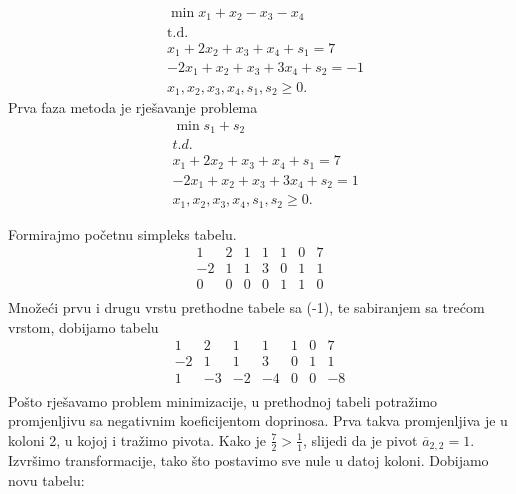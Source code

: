 \documentclass[a4paper, utf8, 11pt, colorlinks]{book}
\theoremstyle{definition}
\begin{document}
\begin{align*}
	&\min x_1 + x_2 - x_3 - x_4 \\
	&\mbox{t.d.} \\
	&x_1 + 2x_2 + x_3 + x_4 + s_1 = 7 \\
	& -2x_1 + x_2 + x_3 + 3x_4 + s_2 = -1 \\
	& x_1,x_2,x_3,x_4, s_1, s_2\geq 0.
\end{align*}
Prva faza metoda je rješavanje problema 
\begin{align*}
	&\min s_1 + s_2 \\
		&  {t.d.}\\
		& x_1 + 2x_2 + x_3 + x_4 + s_1 = 7 \\
	& -2x_1 + x_2 + x_3 + 3x_4 + s_2 = 1 \\
	& x_1,x_2,x_3,x_4, s_1, s_2\geq 0.
\end{align*}


Formirajmo početnu simpleks tabelu.
$$\begin{array}{cccccc|c}
	1 & 2 & 1 & 1 & 1 &  0 & 7  \\
   -2 & 1 & 1 & 3 & 0 &  1 & 1  \\ \hline
    0 & 0 & 0 & 0 & 1 & 1 &  0  \\
\end{array}
$$
Množeći prvu i drugu vrstu prethodne tabele sa (-1), te sabiranjem sa trećom vrstom, dobijamo tabelu
$$\begin{array}{cccccc|c}
	1 & 2 & 1 & 1 & 1 & 0 & 7 \\
	-2&1  & 1 & 3 & 0 & 1 & 1 \\ \hline
	1 & -3 & -2 & -4 & 0 & 0 & -8 \\ 
\end{array}
 $$
 Pošto rješavamo problem minimizacije, u prethodnoj tabeli potražimo promjenljivu 
 sa negativnim koeficijentom doprinosa. Prva takva promjenljiva je u koloni 2, u kojoj 
 i tražimo pivota.  Kako je $\frac{7}{2} > \frac{1}{1}$, slijedi da je 
 pivot $\overline{a}_{2,2} = 1$. Izvršimo transformacije, tako što postavimo sve nule u datoj koloni. Dobijamo novu tabelu:
 
\end{document}
